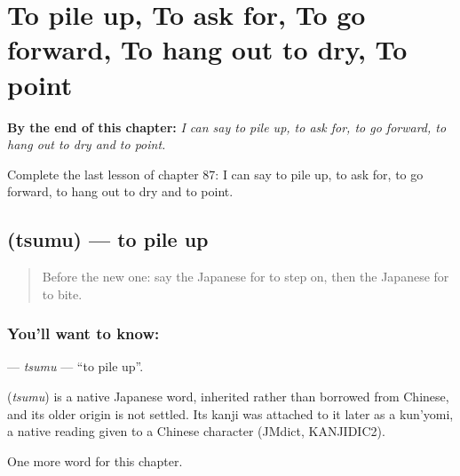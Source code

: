 
\chapter{To pile up, To ask for, To go forward, To hang out to dry, To point}
\label{ch:ja-to-pile-up-to-ask-for-to-go-forward-to-hang-out-to-dry-to-point}

\begin{chapteropening}
\textbf{By the end of this chapter:} \emph{I can say to pile up, to ask for, to go forward, to hang out to dry and to point.}

Complete the last lesson of chapter 87: I can say to pile up, to ask for, to go forward, to hang out to dry and to point.
\end{chapteropening}

\section[\texorpdfstring{\ja{つむ} (tsumu)}{つむ (tsumu)}]{ (tsumu) — to pile up}

\label{lesson:JA-C87-tsumu}



\begin{quote}
Before the new one: say the Japanese for to step on, then the Japanese for to bite.
\end{quote}

\subsection*{You'll want to know: }
\textbf{} — \emph{tsumu} — \textquotedblleft{}to pile up\textquotedblright{}.

\begin{cousinweb}
\textbf{} (\emph{tsumu}) is a native Japanese word, inherited rather than borrowed from Chinese, and its older origin is not settled. Its kanji was attached to it later as a kun'yomi, a native reading given to a Chinese character (JMdict, KANJIDIC2).
\end{cousinweb}

\begin{grammarlens}[title={What you've built}]
One more word for this chapter.
\end{grammarlens}

